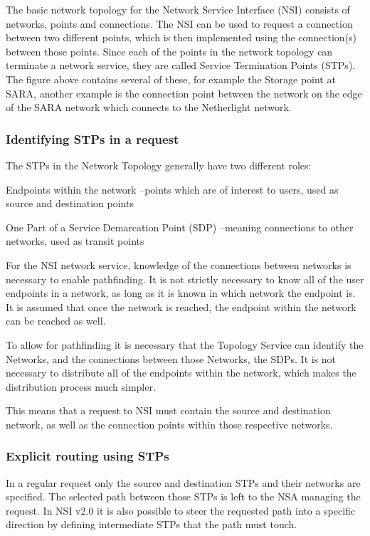 \documentclass{article}
\begin{document}
 The basic network topology for the Network Service Interface (NSI) 
consists of networks, points and connections. The NSI can be used to request a 
connection between two different points, which is then implemented using the connection(s) 
between those points. Since each of the points in the network topology can terminate 
a network service, they are called Service Termination Points (STPs). The figure 
above contains several of these, for example the Storage point at SARA, another 
example is the connection point between the network on the edge of the SARA network 
which connects to the Netherlight network.\label{h.htn600ljqx1v}


\subsubsection{Identifying STPs in a request}

 The STPs in the Network Topology generally have two different 
roles:

 Endpoints within the network –points which are of interest to 
users, used as source and destination points

 One Part of a Service Demarcation Point (SDP) –meaning connections 
to other networks, used as transit points


 For the NSI network service, knowledge of the connections between 
networks is necessary to enable pathfinding. It is not strictly necessary to know 
all of the user endpoints in a network, as long as it is known in which network 
the endpoint is. It is assumed that once the network is reached, the endpoint within 
the network can be reached as well.

 To allow for pathfinding it is necessary that the Topology Service 
can identify the Networks, and the connections between those Networks, the SDPs. 
It is not necessary to distribute all of the endpoints within the network, which 
makes the distribution process much simpler.

 This means that a request to NSI must contain the source and destination 
network, as well as the connection points within those respective networks.


\subsubsection{Explicit routing using STPs}

 In a regular request only the source and destination STPs and 
their networks are specified. The selected path between those STPs is left to the 
NSA managing the request. In NSI v2.0 it is also possible to steer the requested 
path into a specific direction by defining intermediate STPs that the path must 
touch.
\end{document}
